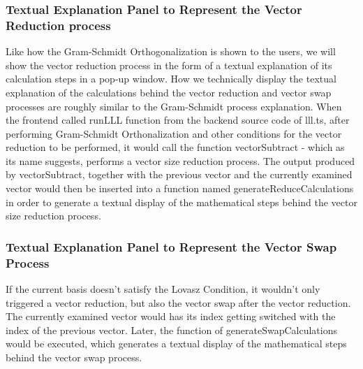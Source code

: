 \documentclass[runningheads]{llncs}
\begin{document}
\subsubsection{Textual Explanation Panel to Represent the Vector Reduction process}
\mbox{}
Like how the Gram-Schmidt Orthogonalization is shown to the users, we will show the vector reduction process in the form of a textual explanation of its calculation steps in a pop-up window. How we technically display the textual explanation of the calculations behind the vector reduction and vector swap processes are roughly similar to the Gram-Schmidt process explanation. When the frontend called runLLL function from the backend source code of lll.ts, after performing Gram-Schmidt Orthonalization and other conditions for the vector reduction to be performed, it would call the function vectorSubtract - which as its name suggests, performs a vector size reduction process. The output produced by vectorSubtract, together with the previous vector and the currently examined vector would then be inserted into a function named generateReduceCalculations in order to generate a textual display of the mathematical steps behind the vector size reduction process.

\subsubsection{Textual Explanation Panel to Represent the Vector Swap Process}
\mbox{}
If the current basis doesn't satisfy the Lovasz Condition, it wouldn't only triggered a vector reduction, but also the vector swap after the vector reduction. The currently examined vector would has its index getting switched with the index of the previous vector. Later, the function of generateSwapCalculations would be executed, which generates a textual display of the mathematical steps behind the vector swap process. 
\end{document}
